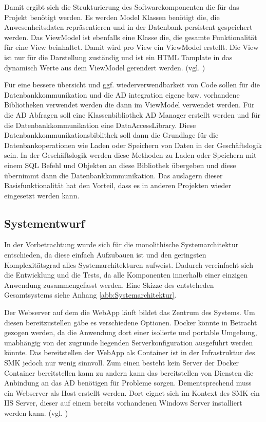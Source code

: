 Damit ergibt sich die Strukturierung des Softwarekomponenten die für das Projekt benötigt werden. Es werden Model Klassen benötigt die, die Anwesenheitsdaten repräsentieren und in der Datenbank persistent gespeichert werden. Das ViewModel ist ebenfalls eine Klasse die, die gesamte Funktionalität für eine View beinhaltet. Damit wird pro View ein ViewModel erstellt. Die View ist nur für die Darstellung zuständig und ist ein HTML Tamplate in das dynamisch Werte aus dem ViewModel gerendert werden. (vgl. \cite{MVVM})

Für eine bessere übersicht und ggf. wiederverwendbarkeit von Code sollen für die Datenbankkommunikation und die AD integration eigene bzw. vorhandene Bibliotheken verwendet werden die dann im ViewModel verwendet werden. Für die AD Abfragen soll eine Klassenbibliothek AD Manager erstellt werden und für die Datenbankkommunikation eine DataAccessLibrary. Diese Datenbankkommunikationsbiblithek soll dann die Grundlage für die Datenbankoperationen wie Laden oder Speichern von Daten in der Geschäftslogik sein. In der Geschäftslogik werden diese Methoden zu Laden oder Speichern mit einem SQL Befehl und Objekten an diese Bibliothek übergeben und diese übernimmt dann die Datenbankkommunikation. Das auslagern dieser Basisfunktionalität hat den Vorteil, dass es in anderen Projekten wieder eingesetzt werden kann.

\subsection{Systementwurf}
\label{sec:Systementwurf}
In der Vorbetrachtung wurde sich für die monolithische Systemarchitektur entschieden, da diese einfach Aufzubauen ist und den geringsten Komplexitätsgrad alles Systemarchitekturen aufweist. Dadurch vereinfacht sich die Entwicklung und die Tests, da alle Komponenten innerhalb einer einzigen Anwendung zusammengefasst werden. Eine Skizze des entsteheden Gesamtsystems siehe Anhang \ref{abb:Systemarchitektur}.

Der Webserver auf dem die WebApp läuft bildet das Zentrum des Systems. Um diesen bereitzustellen gäbe es verschiedene Optionen. Docker könnte in Betracht gezogen werden, da die Anwendung dort einer isolierte und portable Umgebung, unabhängig von der zugrunde liegenden Serverkonfiguration ausgeführt werden könnte. Das bereitstellen der WebApp als Container ist in der Infrastruktur des SMK jedoch nur wenig sinnvoll. Zum einen besteht kein Server der Docker Container bereitstellen kann zu andern kann das bereitstellen von Diensten die Anbindung an das AD benötigen für Probleme sorgen. Dementsprechend muss ein Webserver als Host erstellt werden. Dort eignet sich im Kontext des SMK ein IIS Server, dieser auf einem bereits vorhandenen Windows Server installiert werden kann. (vgl. \cite{Architekturen})


